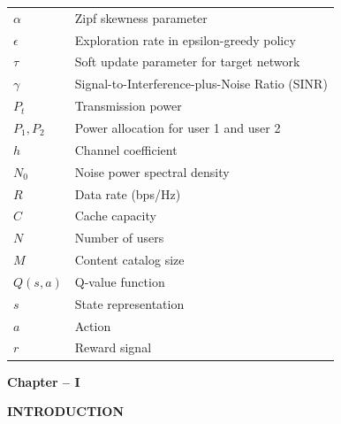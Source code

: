 \documentclass[12pt,a4paper]{article}
\begin{document}
\begin{tabular}{@{}ll@{}}
$\alpha$ & Zipf skewness parameter \\
$\epsilon$ & Exploration rate in epsilon-greedy policy \\
$\tau$ & Soft update parameter for target network \\
$\gamma$ & Signal-to-Interference-plus-Noise Ratio (SINR) \\
$P_t$ & Transmission power \\
$P_1, P_2$ & Power allocation for user 1 and user 2 \\
$h$ & Channel coefficient \\
$N_0$ & Noise power spectral density \\
$R$ & Data rate (bps/Hz) \\
$C$ & Cache capacity \\
$N$ & Number of users \\
$M$ & Content catalog size \\
$Q(s,a)$ & Q-value function \\
$s$ & State representation \\
$a$ & Action \\
$r$ & Reward signal \\
\end{tabular}

\thispagestyle{plain}


\clearpage
{}
\setcounter{page}{1}

\begin{center}
    \vspace*{10cm}
    
    {\fontsize{16}{19.2}\selectfont\bfseries
    Chapter -- I}
    
    \vspace{1cm}
    
    {\fontsize{16}{19.2}\selectfont\bfseries
    INTRODUCTION}
    
    \vspace*{\fill}
\end{center}

\thispagestyle{plain}

\end{document}
